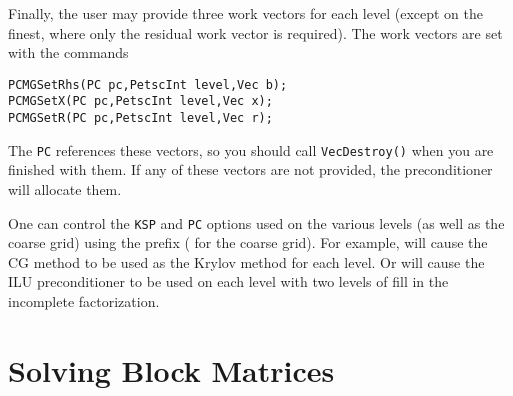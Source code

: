 Finally, the user may provide three work vectors for each level
(except on the finest, where only the residual work vector is required).
The work vectors are set with the commands
\begin{lstlisting}
PCMGSetRhs(PC pc,PetscInt level,Vec b);
PCMGSetX(PC pc,PetscInt level,Vec x);
PCMGSetR(PC pc,PetscInt level,Vec r);
\end{lstlisting}
The \lstinline{PC} references these vectors, so you should call \lstinline{VecDestroy()}
when you are finished with them.  If any of these vectors are not
provided, the preconditioner will allocate them.

One can control the \lstinline{KSP} and \lstinline{PC} options used on the various levels
(as well as the coarse grid) using the prefix 
( for the coarse grid).
 For example, 
will cause the CG method to be used as the Krylov method for each level.
Or 
will cause the ILU preconditioner to be used on each level with
two levels of fill in the incomplete factorization.

\section{Solving Block Matrices}
\label{sec_block_matrices}

